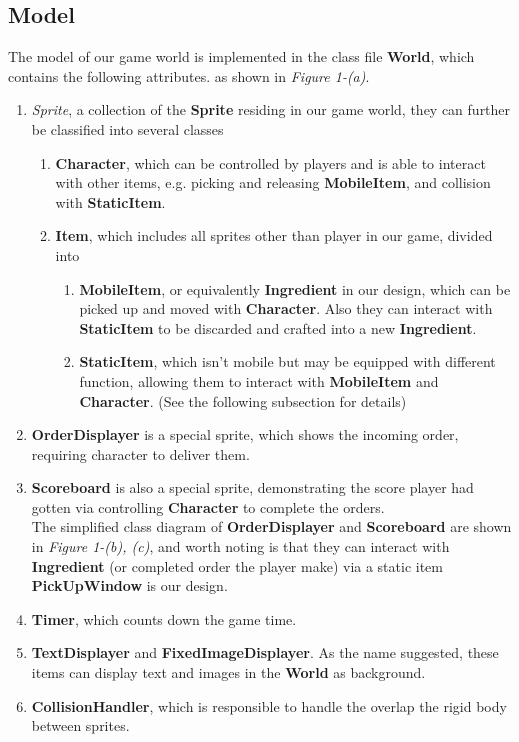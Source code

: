 \subsection{Model}
The model of our game world is implemented in the class file \textbf{World}, which contains the following attributes. as shown in \textit{Figure 1-(a)}.
\begin{enumerate}
\item \textit{Sprite}, a collection of the \textbf{Sprite} residing in our game world, they can further be classified into several classes
\begin{enumerate}
\item \textbf{Character}, which can be controlled by players and is able to interact with other items, e.g. picking and releasing \textbf{MobileItem}, and collision with \textbf{StaticItem}.
\item \textbf{Item}, which includes all sprites other than player in our game, divided into
\begin{enumerate}
\item \textbf{MobileItem}, or equivalently \textbf{Ingredient} in our design, which can be picked up and moved with \textbf{Character}. Also they can interact with \textbf{StaticItem} to be discarded and crafted into a new \textbf{Ingredient}.
\item \textbf{StaticItem}, which isn't mobile but may be equipped with different function, allowing them to interact with \textbf{MobileItem} and \textbf{Character}. (See the following subsection for details)
\end{enumerate}

\end{enumerate}
\item \textbf{OrderDisplayer} is a special sprite, which shows the incoming order, requiring character to deliver them.
\item \textbf{Scoreboard} is also a special sprite, demonstrating the score player had gotten via controlling \textbf{Character} to complete the orders.\\
The simplified class diagram of \textbf{OrderDisplayer} and \textbf{Scoreboard} are shown in \textit{Figure 1-(b), (c)}, and worth noting is that they can interact with \textbf{Ingredient} (or completed order the player make) via a static item \textbf{PickUpWindow} is our design.
\item \textbf{Timer}, which counts down the game time.
\item \textbf{TextDisplayer} and \textbf{FixedImageDisplayer}. As the name suggested, these items can display text and images in the \textbf{World} as background.
\item \textbf{CollisionHandler}, which is responsible to handle the overlap the rigid body between sprites.
\end{enumerate}
